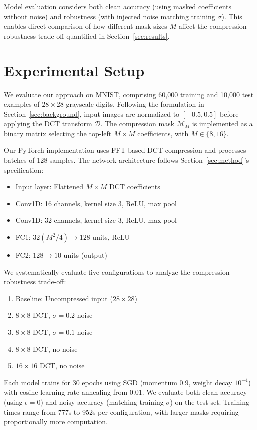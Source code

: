 \documentclass{article} %
\begin{document}
Model evaluation considers both clean accuracy (using masked coefficients without noise) and robustness (with injected noise matching training $\sigma$). This enables direct comparison of how different mask sizes $M$ affect the compression-robustness trade-off quantified in Section~\ref{sec:results}.

\section{Experimental Setup}
\label{sec:experimental}

We evaluate our approach on MNIST, comprising 60,000 training and 10,000 test examples of $28 \times 28$ grayscale digits. Following the formulation in Section~\ref{sec:background}, input images are normalized to $[-0.5, 0.5]$ before applying the DCT transform $\mathcal{D}$. The compression mask $\mathcal{M}_M$ is implemented as a binary matrix selecting the top-left $M \times M$ coefficients, with $M \in \{8, 16\}$.

Our PyTorch implementation uses FFT-based DCT compression and processes batches of 128 samples. The network architecture follows Section~\ref{sec:method}'s specification:
\begin{itemize}
    \item Input layer: Flattened $M \times M$ DCT coefficients
    \item Conv1D: 16 channels, kernel size 3, ReLU, max pool
    \item Conv1D: 32 channels, kernel size 3, ReLU, max pool
    \item FC1: $32(M^2/4) \rightarrow 128$ units, ReLU
    \item FC2: $128 \rightarrow 10$ units (output)
\end{itemize}

We systematically evaluate five configurations to analyze the compression-robustness trade-off:
\begin{enumerate}
    \item Baseline: Uncompressed input ($28 \times 28$)
    \item $8 \times 8$ DCT, $\sigma = 0.2$ noise
    \item $8 \times 8$ DCT, $\sigma = 0.1$ noise
    \item $8 \times 8$ DCT, no noise
    \item $16 \times 16$ DCT, no noise
\end{enumerate}

Each model trains for 30 epochs using SGD (momentum 0.9, weight decay $10^{-4}$) with cosine learning rate annealing from 0.01. We evaluate both clean accuracy (using $\epsilon = 0$) and noisy accuracy (matching training $\sigma$) on the test set. Training times range from 777s to 952s per configuration, with larger masks requiring proportionally more computation.
\end{document}
